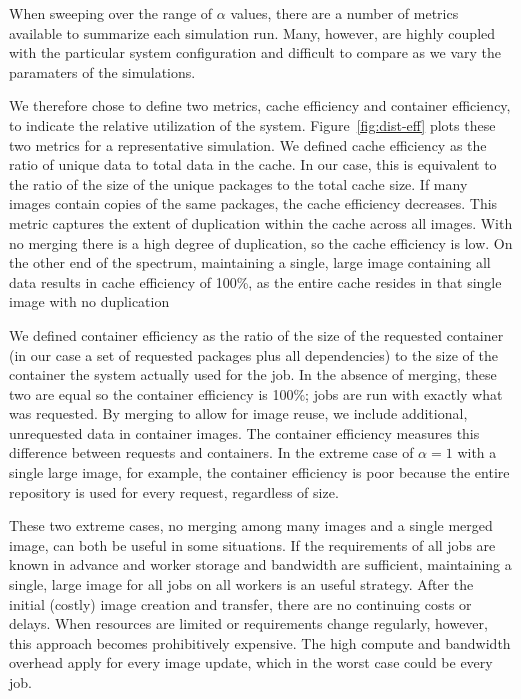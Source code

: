 \documentclass[sigconf]{acmart}
\begin{document}
When sweeping over the range of $\alpha$ values,
there are a number of metrics available to summarize each simulation run.
Many, however, are highly coupled with the particular system configuration and difficult to compare as we vary the paramaters of the simulations.

We therefore chose to define two metrics, cache efficiency and container efficiency,
to indicate the relative utilization of the system.
Figure~\ref{fig:dist-eff} plots these two metrics for a representative simulation.
We defined cache efficiency as the ratio of unique data to total data in the cache.
In our case, this is equivalent to the ratio of the size of the unique packages to the total cache size.
If many images contain copies of the same packages,
the cache efficiency decreases.
This metric captures the extent of duplication within the cache across all images.
With no merging there is a high degree of duplication,
so the cache efficiency is low.
On the other end of the spectrum,
maintaining a single, large image containing all data results in cache efficiency of 100\%,
as the entire cache resides in that single image with no duplication

We defined container efficiency as the ratio of the size of the requested container
(in our case a set of requested packages plus all dependencies)
to the size of the container the system actually used for the job.
In the absence of merging,
these two are equal so the container efficiency is 100\%;
jobs are run with exactly what was requested.
By merging to allow for image reuse,
we include additional, unrequested data in container images.
The container efficiency measures this difference between requests and containers.
In the extreme case of $\alpha=1$ with a single large image, for example,
the container efficiency is poor because the entire repository is used for every request,
regardless of size.

These two extreme cases, no merging among many images and a single merged image,
can both be useful in some situations.
If the requirements of all jobs are known in advance and worker storage and bandwidth are sufficient,
maintaining a single, large image for all jobs on all workers is an useful strategy.
After the initial (costly) image creation and transfer,
there are no continuing costs or delays.
When resources are limited or requirements change regularly,
however, this approach becomes prohibitively expensive.
The high compute and bandwidth overhead apply for every image update,
which in the worst case could be every job.
\end{document}
